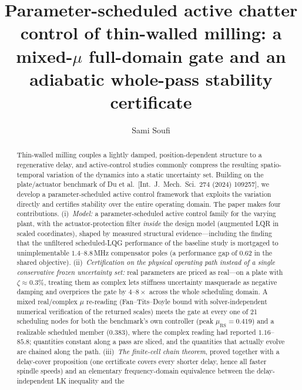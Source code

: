 \documentclass[preprint,12pt]{elsarticle}
\newcommand{\muRS}{\mu_{\mathrm{RS}}}
\begin{document}
\begin{frontmatter}

\title{Parameter-scheduled active chatter control of thin-walled
milling: a mixed-$\mu$ full-domain gate and an adiabatic whole-pass
stability certificate}

\author[enis]{Sami Soufi}

\begin{abstract}
Thin-walled milling couples a lightly damped, position-dependent
structure to a regenerative delay, and active-control studies commonly
compress the resulting spatio-temporal variation of the dynamics into a
static uncertainty set.  Building on the plate/actuator benchmark of Du
et al.\ [Int.\ J.\ Mech.\ Sci.\ 274 (2024) 109257], we develop a
parameter-scheduled active control framework that exploits the variation
directly and certifies stability over the entire operating domain.  The
paper makes four contributions.
(i)~\emph{Model:} a parameter-scheduled active control family for the
varying plant, with the actuator-protection filter \emph{inside} the
design model (augmented LQR in scaled coordinates), shaped by measured
structural evidence---including the finding that the unfiltered
scheduled-LQG performance of the baseline study is mortgaged to
unimplementable $1.4$--$8.8$\,MHz compensator poles (a performance gap
of $0.62$ in the shared objective).
(ii)~\emph{Certification on the physical operating path instead of a
single conservative frozen uncertainty set:} real parameters are
priced as real---on a plate with $\zeta \approx 0.3\%$, treating them
as complex lets stiffness uncertainty masquerade as negative damping
and overprices the gate by $4$--$8\times$ across the whole scheduling
domain.  A mixed real/complex $\mu$ re-reading (Fan--Tits--Doyle
bound with solver-independent numerical verification of the returned
scales) meets the gate at every one of 21 scheduling nodes for both
the benchmark's own controller (peak $\muRS = 0.419$) and a
realizable scheduled member ($0.383$), where the complex reading had
reported $1.16$--$85.8$; quantities constant along a pass are sliced,
and the quantities that actually evolve are chained along the path.
(iii)~\emph{The finite-cell chain theorem}, proved together with a
delay-cover proposition (one certificate covers every shorter delay,
hence all faster spindle speeds) and an elementary frequency-domain
equivalence between the delay-independent LK inequality and the

\end{abstract}
\end{frontmatter}
\end{document}
